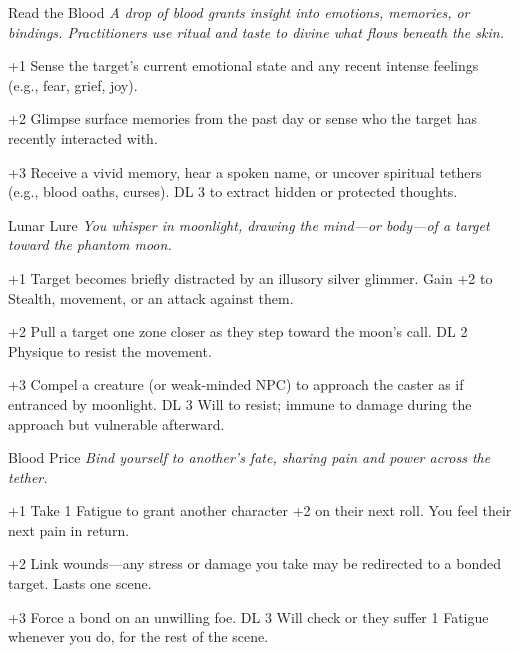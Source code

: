 \begin{WyrdSpell}[Bloodbinding]{Read the Blood}\label{spell:read-the-blood}
\textit{A drop of blood grants insight into emotions, memories, or bindings. Practitioners use ritual and taste to divine what flows beneath the skin.}
    \begin{WyrdSpellBlock}
        \item[+1] Sense the target's current emotional state and any recent intense feelings (e.g., fear, grief, joy).
        \item[+2] Glimpse surface memories from the past day or sense who the target has recently interacted with.
        \item[+3] Receive a vivid memory, hear a spoken name, or uncover spiritual tethers (e.g., blood oaths, curses). DL 3 to extract hidden or protected thoughts.
    \end{WyrdSpellBlock}
\end{WyrdSpell}

\begin{WyrdSpell}[Astral]{Lunar Lure}\label{spell:lunar-lure}
    \textit{You whisper in moonlight, drawing the mind—or body—of a target toward the phantom moon.}
    
    \begin{WyrdSpellBlock}
        \item[+1] Target becomes briefly distracted by an illusory silver glimmer. Gain +2 to Stealth, movement, or an attack against them.
        
        \item[+2] Pull a target one zone closer as they step toward the moon’s call. DL 2 Physique to resist the movement.
        
        \item[+3] Compel a creature (or weak-minded NPC) to approach the caster as if entranced by moonlight. DL 3 Will to resist; immune to damage during the approach but vulnerable afterward.
    \end{WyrdSpellBlock}
\end{WyrdSpell}

\begin{WyrdSpell}[Bloodbinding]{Blood Price}
\textit{Bind yourself to another’s fate, sharing pain and power across the tether.}
    \begin{WyrdSpellBlock}
        \item[+1] Take 1 Fatigue to grant another character +2 on their next roll. You feel their next pain in return.
        \item[+2] Link wounds—any stress or damage you take may be redirected to a bonded target. Lasts one scene.
        \item[+3] Force a bond on an unwilling foe. DL 3 Will check or they suffer 1 Fatigue whenever you do, for the rest of the scene.
    \end{WyrdSpellBlock}
\end{WyrdSpell}


